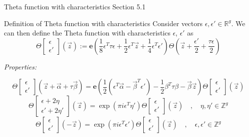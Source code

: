\documentclass[11pt,aspectratio=169]{beamer}
\newcommand{\ee}[0]{\mathbf{e}}
\begin{document}
\begin{frame}{Theta function with characteristics}{\tiny \cite{Ber06} Section 5.1}
    \begin{block}{Definition of Theta function with characteristics}
        Consider vectors $ \epsilon ,  \epsilon' \in \mathbb R^g$.
        We can then define the Theta function with characteristics $ \epsilon$, $ \epsilon'$ as
        \[\Theta\begin{bmatrix} \epsilon \\  \epsilon'\end{bmatrix}(\vec z) := 
        \ee\left(\frac{1}{8}\epsilon^T \tau \epsilon + \frac{1}{2}\epsilon^T \vec z + \frac{1}{4}\epsilon^T  \epsilon'\right)
        \Theta(\vec z + \frac{\epsilon'}{2}+\frac{\tau\epsilon}{2})\]
    \end{block}
    \emph{Properties:}

    \[\Theta\begin{bmatrix}\epsilon \\ \epsilon'\end{bmatrix}(\vec z + \vec \alpha + \tau \vec \beta) =
    \ee\left(\frac{1}{2}(\epsilon^T \vec \alpha - \vec \beta^T \epsilon') - \frac{1}{2} \beta^T \tau \beta - \vec \beta \vec z\right)
    \Theta\begin{bmatrix}\epsilon \\ \epsilon'\end{bmatrix}(\vec z)\]
    \[\Theta\begin{bmatrix}\epsilon + 2\eta \\ \epsilon' + 2\eta' \end{bmatrix}(\vec z) = \exp(\pi i \epsilon^T \eta')
    \Theta\begin{bmatrix}\epsilon \\ \epsilon'\end{bmatrix}(\vec z) \quad , \quad \eta,\eta' \in \mathbb Z^g\]
    \[\Theta\begin{bmatrix}\epsilon \\ \epsilon'\end{bmatrix}(-\vec z) = \exp(\pi i \epsilon^T \epsilon') \Theta\begin{bmatrix}\epsilon \\ \epsilon'\end{bmatrix}(\vec z) \quad , \quad \epsilon,\epsilon' \in \mathbb Z^g\]
\end{frame}
\end{document}
